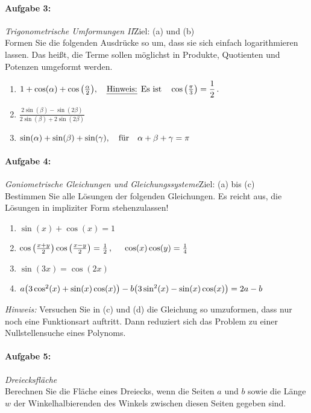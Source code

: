 \paragraph{Aufgabe 3: } \emph{Trigonometrische Umformungen II}\hfill Ziel: (a) und (b)\\[0.2cm]
Formen Sie die folgenden Ausdrücke so um, dass sie sich einfach logarithmieren lassen. Das heißt, die Terme sollen möglichst in Produkte, Quotienten und Potenzen umgeformt werden.\\[-1.3em]

\begin{enumerate}[label=(\alph*)]
    \item $1+\cos(\alpha) + \cos\qty(\frac{\alpha}{2}), \qq{\emph{Hinweis:} Es ist} \cos\qty(\frac{\pi}{3})=\dfrac{1}{2}\,.$
    \item $\frac{2\sin(\beta) - \sin (2\beta)}{2\sin(\beta)+2\sin(2\beta)}$
    \item $\sin(\alpha)+\sin(\beta)+\sin(\gamma), \qq{für} \alpha+\beta+\gamma = \pi$
\end{enumerate}
%
\paragraph{Aufgabe 4: } \emph{Goniometrische Gleichungen und Gleichungssysteme}\hfill Ziel: (a) bis (c)\\[0.2cm]
Bestimmen Sie alle Lösungen der folgenden Gleichungen. Es reicht aus, die Lösungen in impliziter Form stehenzulassen!
\begin{enumerate}[label=(\alph*)]
    \item $\sin(x)+\cos(x)= 1$
    \item $\cos\qty(\frac{x+y}{2})\cos\qty(\frac{x-y}{2})=\frac{1}{2}\,, \hspace{0.5cm}\cos(x)\cos(y)=\frac{1}{4}$
    \item $\sin(3x)=\cos(2x)$
    \item $a\qty(3\cos^2(x)+\sin(x)\cos(x))-b\qty(3\sin^2(x)-\sin(x)\cos(x))=2a-b$
\end{enumerate}
\emph{Hinweis:} Versuchen Sie in (c) und (d) die Gleichung so umzuformen, dass nur noch eine Funktionsart auftritt. Dann reduziert sich das Problem zu einer Nullstellensuche eines Polynoms.

\paragraph{Aufgabe 5: } \emph{Dreiecksfläche}\\[0.2cm]
Berechnen Sie die Fläche eines Dreiecks, wenn die Seiten $a$ und $b$ sowie die Länge $w$ der Winkelhalbierenden des Winkels zwischen diesen Seiten gegeben sind.
